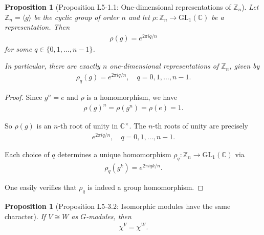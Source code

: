 \documentclass[titlepage]{article}
\theoremstyle{plain}
\newtheorem{proposition}[theorem]{Proposition}
\theoremstyle{definition}
\theoremstyle{remark}
\theoremstyle{exercise-style}
\numberwithin{equation}{section}
\numberwithin{theorem}{section}
\numberwithin{remark}{section}
\begin{document}
\begin{myboxg}
    \begin{proposition}[Proposition L5-1.1: One-dimensional representations of $\mathbb{Z}_n$]
        Let $\mathbb{Z}_n = \langle g \rangle$ be the cyclic group of order $n$ and let $\rho : \mathbb{Z}_n \to \mathrm{GL}_1(\mathbb{C})$ be a representation. Then
        \begin{align}
            \rho(g) = e^{2\pi i q / n}
        \end{align}
        for some $q \in \{0,1,\dots,n-1\}$.
        
        In particular, there are exactly $n$ one-dimensional representations of $\mathbb{Z}_n$, given by
        \begin{align}
            \rho_q(g) = e^{2\pi i q / n}, \quad q = 0,1,\dots,n-1.
        \end{align}
    \end{proposition}
\end{myboxg}

\begin{proof}
    Since $g^n = e$ and $\rho$ is a homomorphism, we have
    \begin{align}
        \rho(g)^n = \rho(g^n) = \rho(e) = 1.
    \end{align}
    
    So $\rho(g)$ is an $n$-th root of unity in $\mathbb{C}^\times$. The $n$-th roots of unity are precisely
    \begin{align}
        e^{2\pi i q / n}, \quad q = 0,1,\dots,n-1.
    \end{align}
    
    Each choice of $q$ determines a unique homomorphism $\rho_q : \mathbb{Z}_n \to \mathrm{GL}_1(\mathbb{C})$ via
    \begin{align}
        \rho_q(g^k) = e^{2\pi i qk / n}.
    \end{align}
    
    One easily verifies that $\rho_q$ is indeed a group homomorphism.
\end{proof}

\begin{myboxg}
    \begin{proposition}[Proposition L5-3.2: Isomorphic modules have the same character]
        If $V \cong W$ as $G$-modules, then
        \begin{align}
            \chi^V = \chi^W.
        \end{align}
    \end{proposition}
\end{myboxg}
\end{document}
